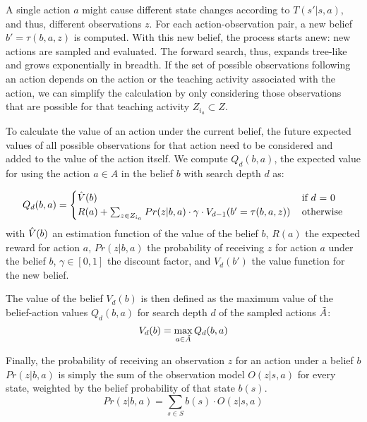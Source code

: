 A single action $a$ might cause different state changes according to $T(s'|s,a)$, and thus, different observations $z$.
For each action-observation pair, a new belief $b'=\tau(b,a,z)$ is computed.
With this new belief, the process starts anew: new actions are sampled and evaluated.
The forward search, thus, expands tree-like and grows exponentially in breadth.
If the set of possible observations following an action depends on the action or the teaching activity associated with the action, we can simplify the calculation by only considering those observations that are possible for that teaching activity $Z_{i_a} \subset Z$.

To calculate the value of an action under the current belief, the future expected values of all possible observations for that action need to be considered and added to the value of the action itself. 
We compute $Q_d(b, a)$, the expected value for using the action $a \in A$ in the belief $b$ with search depth $d$ as:

\begin{equation}
    Q_d(b, a) = \begin{cases}
        \Hat{V}(b) & \, \text{if $d$ = 0}\\
        R(a) + \sum_{z \in Z_{i_a}} Pr(z|b,a) \cdot \gamma \cdot V_{d-1}(b' = \tau(b, a, z)) & \, \text{otherwise}
    \end{cases}
\end{equation}
with
$\Hat{V}(b)$ an estimation function of the value of the belief $b$, 
$R(a)$ the expected reward for action $a$,
$Pr(z|b,a)$ the probability of receiving $z$ for action $a$ under the belief $b$,
$\gamma \in [0, 1]$ the discount factor, 
and $V_d(b')$ the value function for the new belief.

The value of the belief $V_d(b)$ is then defined as the maximum value of the belief-action values $Q_d(b,a)$ for search depth $d$ of the sampled actions $\Tilde{A}$:
\begin{equation}
    V_d(b) = \max_{a \in \Tilde{A}} Q_d(b, a)
\end{equation}

Finally, the probability of receiving an observation $z$ for an action under a belief $b$ $Pr(z|b,a)$ is simply the sum of the observation model $O(z|s,a)$ for every state, weighted by the belief probability of that state $b(s)$.
\begin{equation}
    Pr(z|b,a) = \sum_{s \in S} b(s) \cdot O(z|s,a)
\end{equation}



